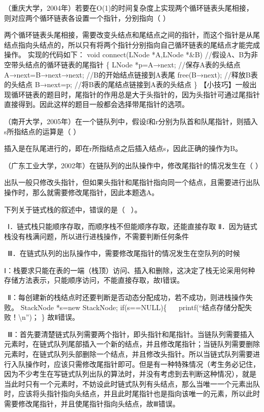 \question （重庆大学，2004年）若要在O(1)的时间复杂度上实现两个循环链表头尾相接，则对应两个循环链表各设置一个指针，分别指向（
）
\par{}
\begin{solution}两个循环链表头尾相接，需要改变头结点和尾结点之间的指针，而这个指针是从尾结点指向头结点的，所以只有将两个指针分别指向自己循环链表的尾结点才能完成操作。
实现的代码如下： void connect(LNode *A,LNode *\&B)
//假设A、B为非空带头结点的循环链表的尾指针 \{ LNode *p=A→next;
//保存A表的头结点 A→next=B→next→next; //B的开始结点链接到A表尾
free(B→next); //释放B表的头结点 B→next=p;
//将B表的尾结点链接到A表的头结点 \}
【小技巧】一般出现循环链表的题目时，尾指针的作用总是大于头指针的，因为头指针可通过尾指针直接得到。因此这样的题目一般都会选择带尾指针的选项。
\end{solution}
\question （南开大学，2005年）在一个链队列中，假设f和r分别为队首和队尾指针，则插入s所指结点的运算是（
）
\par{}
\begin{solution}插入是在队尾进行的，即在r所指结点之后插入结点s，因此正确的操作为B。
\end{solution}
\question （广东工业大学，2002年）在链队列的出队操作中，修改尾指针的情况发生在（
）
\par{}
\begin{solution}出队一般只修改头指针，但如果头指针和尾指针指向同一个结点，且需要进行出队操作时，那么就需要修改尾指针，因此本题选A。
\end{solution}
\question 下列关于链式栈的叙述中，错误的是（ ~）。

~Ⅰ．链式栈只能顺序存取，而顺序栈不但能顺序存取，还能直接存取
Ⅱ．因为链式栈没有栈满问题，所以进行进栈操作，不需要判断任何条件

~Ⅲ．在链式队列的出队操作中，需要修改尾指针的情况发生在空队列的时候
\par{}
\begin{solution}Ⅰ：栈要求只能在表的一端（栈顶）访问、插入和删除，这决定了栈无论采用何种存储方法表示，只能顺序访问，不能直接存取，故Ⅰ错误。

~Ⅱ：每创建新的栈结点时还要判断是否动态分配成功，若不成功，则进栈操作失败。
StackNode *s=new StackNode; if(s==NULL)\{ ~
~printf(``结点存储分配失败！\textbackslash{}n'')； \} 故Ⅱ错误。

~Ⅲ：首先要清楚链式队列需要两个指针，即头指针和尾指针。当链队列需要插入元素时，在链式队列尾部插入一个新的结点，并且修改尾指针；当链队列需要删除元素时，在链式队列头部删除一个结点，并且修改头指针。所以当链式队列需要进行入队操作时，应该只需修改尾指针即可。但是有一种特殊情况（考生务必记住，因为不少考生在写链式队列出队的算法时，并没有考虑到去判断这种情况），就是当此时只有一个元素时，不妨设此时链式队列有头结点，那么当唯一一个元素出队时，应该将头指针指向头结点，并且此时尾指针也是指向该唯一的元素，所以此时需要修改尾指针，并且使尾指针指向头结点，故Ⅲ错误。
\end{solution}
